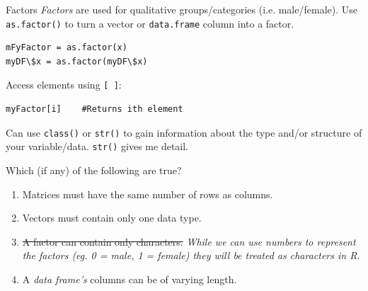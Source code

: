 \documentclass[xcolor=svgnames, 10pt, handout]{beamer}
\begin{document}
\begin{frame}[fragile]{Factors}
\emph{Factors} are used for qualitative groups/categories (i.e. male/female).  Use \verb|as.factor()| to turn a vector or \verb|data.frame| column into a factor.
\vfill
\begin{Verbatim}[commandchars=\\\{\}, xleftmargin=2em]
mFyFactor = as.factor(x)
myDF\$x = as.factor(myDF\$x)
\end{Verbatim}
\vfill
Access elements using \verb|[ ]|:
\begin{Verbatim}[commandchars=\\\{\}, xleftmargin=2em]
myFactor[i]    #Returns ith element
\end{Verbatim}
\vfill
Can use \verb|class()| or \verb|str()| to gain information about the type and/or structure of your variable/data. \verb|str()|  gives me detail.
\vfill
\end{frame}


\begin{frame}[fragile]
\begin{question}
Which (if any) of the following are true?
\begin{enumerate}
\item Matrices must have the same number of rows as columns. \onslide<+-> \pxmark
\item Vectors must contain only one data type. \pcmark
\item \st{A factor can contain only characters.} 
\textit{While we can use numbers to represent the factors (eg. 0 = male, 1 = female) they will be treated as characters in R. }
\item A  \emph{data frame's} columns can be of varying length. \pxmark
\end{enumerate}
\end{question}
\end{frame}
\end{document}
